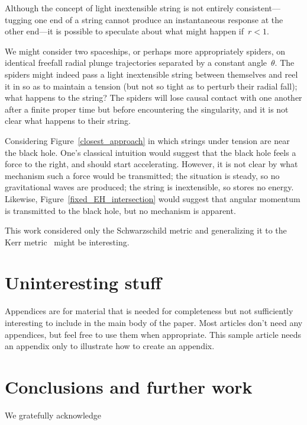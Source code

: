 \documentclass[prb,preprint]{revtex4-1}
\begin{document}
Although the concept of light inextensible string is not entirely
consistent---tugging one end of a string cannot produce an
instantaneous response at the other end---it is possible to speculate
about what might happen if~$r<1$.

We might consider two spaceships, or perhaps more appropriately
spiders, on identical freefall radial plunge trajectories separated by
a constant angle~$\theta$.  The spiders might indeed pass a light
inextensible string between themselves and reel it in so as to
maintain a tension (but not so tight as to perturb their radial fall);
what happens to the string?  The spiders will lose causal contact with
one another after a finite proper time but before encountering the
singularity, and it is not clear what happens to their string.

Considering Figure~\ref{closest_approach} in which strings under
tension are near the black hole.  One's classical intuition would
suggest that the black hole feels a force to the right, and should
start accelerating.  However, it is not clear by what mechanism such a
force would be transmitted; the situation is steady, so no
gravitational waves are produced; the string is inextensible, so
stores no energy.  Likewise, Figure~\ref{fixed_EH_intersection} would
suggest that angular momentum is transmitted to the black hole, but no
mechanism is apparent.

This work considered only the Schwarzschild metric and generalizing it
to the Kerr metric~\cite{asdfsadfasfd} might be interesting.  

\appendix*   %

\section{Uninteresting stuff}

Appendices are for material that is needed for completeness but
not sufficiently interesting to include in the main body of the paper.  Most
articles don't need any appendices, but feel free to use them when
appropriate.  This sample article needs an appendix only to illustrate how 
to create an appendix.

\section{Conclusions and further work}


\begin{acknowledgments}

We gratefully acknowledge 
\end{acknowledgments}
\end{document}
